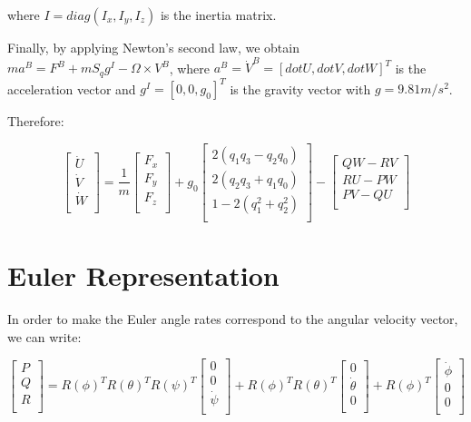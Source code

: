 where $I=diag(I_{x}, I_{y}, I_{z})$ is the inertia matrix.

Finally, by applying Newton's second law, we obtain $m a^{B}=F^{B}+m S_{q} g^{I} - \Omega \times V^{B}$, where $a^{B}=\dot{V}^{B}=[dot{U}, dot{V}, dot{W}]^{T}$ is the acceleration vector and $g^{I}=[0, 0, g_{0}]^{T}$ is the gravity vector with $g=9.81m/s^{2}$.

Therefore:

\begin{equation}
\label{S10}
 \begin{bmatrix}
 	\dot{U} \\
 	\dot{V} \\
 	\dot{W} \\
 	\end{bmatrix}= \frac{1}{m}\begin{bmatrix}
 	F_{x}  \\
 	F_{y}   \\
 	F_{z}   \\
 	\end{bmatrix} + g_{0}\begin{bmatrix}
 	2(q_{1}q_{3}-q_{2}q_{0}) \\
 	2(q_{2}q_{3}+q_{1}q_{0}) \\
 	1-2(q_{1}^{2}+q_{2}^{2}) \\
 	\end{bmatrix} - \begin{bmatrix}
 	QW -RV \\
 	RU - PW \\
 	PV - QU \\
 	\end{bmatrix}
 	 \end{equation}

\section{Euler Representation}
In order to make the Euler angle rates correspond to the angular velocity vector, we can write:

\begin{equation}
\label{S11}
 \begin{bmatrix}
 	P \\
 	Q \\
 	R \\
 	\end{bmatrix}=R(\phi)^{T}R(\theta)^{T}R(\psi)^{T}\begin{bmatrix}
 	0  \\
 	0  \\
 	\dot{\psi}  \\
 	\end{bmatrix}+R(\phi)^{T}R(\theta)^{T}\begin{bmatrix}
 	0  \\
 	\dot{\theta}  \\
 	0  \\
 	\end{bmatrix}+R(\phi)^{T}\begin{bmatrix}
 	\dot{\phi}  \\
 	0  \\
 	0  \\
 	\end{bmatrix}
 	 \end{equation}

